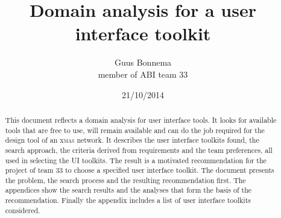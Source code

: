 \documentclass[a4paper,11pt,final]{article}
\author{Guus Bonnema\\member of ABI team 33}
\date{21/10/2014}
\title{\color{blue}Domain analysis for a user interface toolkit}
\begin{document}

\newcommand{\xmas}{x\textsc{mas}}%
\newcommand{\ok}{$\checkmark$}
\newcommand{\w}[1]{\textbf{\textsc{#1}}}
\newcommand\bw[1]{{\color{blue}#1}}

\newcommand{\mybox}[1]{\begin{boxedminipage}[t]{\textwidth}#1\end{boxedminipage}}



\newcommand\smp[1]{%
	\marginpar{\color{blue}\small\bf\textsc#1}
}%
\newcommand\smpp[1]{\smp{#1}#1}


\maketitle

\begin{abstract}

	\noindent{} This document reflects a \bw{domain analysis} for user
	interface tools. It looks for available tools that are free to use, will
	remain available and can do the job required for the design tool of an
	\xmas{} network.  It describes the user interface toolkits found, the
	search approach, the criteria derived from requirements and the team
	preferences, all used in selecting the UI toolkits. The result is a
	motivated recommendation for the project of team 33 to choose a specified
	user interface toolkit. The document presents the problem, the search
	process and the resulting recommendation first. The appendices show the
	search results and the analyses that form the basis of the recommendation.
	Finally the appendix includes a list of user interface toolkits considered.

\end{abstract}
\end{document}
